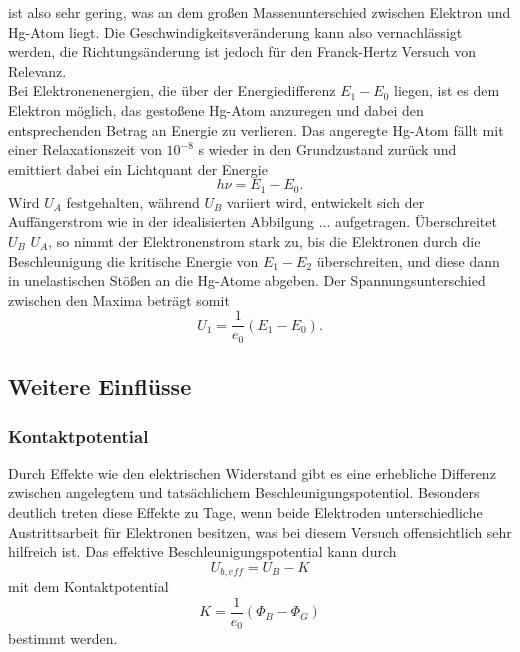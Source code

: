     ist also sehr gering, was an dem großen Massenunterschied zwischen Elektron und 
    Hg-Atom liegt. Die Geschwindigkeitsveränderung kann also vernachlässigt werden,
    die Richtungsänderung ist jedoch für den Franck-Hertz Versuch von Relevanz.\\
    Bei Elektronenenergien, die über der Energiedifferenz $E_1-E_0$ liegen, ist es 
    dem Elektron möglich, das gestoßene Hg-Atom anzuregen und dabei den entsprechenden 
    Betrag an Energie zu verlieren. Das angeregte Hg-Atom fällt mit einer Relaxationszeit
    von $10^{-8}$ s wieder in den 
    Grundzustand zurück und emittiert dabei ein Lichtquant der Energie
    \begin{equation}
        h\nu = E_1-E_0 .
    \end{equation}
    Wird $U_A$ festgehalten, während $U_B$ variiert wird, entwickelt sich der Auffängerstrom
    wie in der idealisierten Abbilgung ... aufgetragen. Überschreitet $U_B$ $U_A$, so 
    nimmt der Elektronenstrom stark zu, bis die Elektronen durch die Beschleunigung die
    kritische Energie von $E_1-E_2$ überschreiten, und diese dann in unelastischen Stößen
    an die Hg-Atome abgeben. Der Spannungsunterschied zwischen den Maxima beträgt somit
    \begin{equation}
        U_1 = \dfrac{1}{e_0}(E_1-E_0).
    \end{equation}

\subsection{Weitere Einflüsse}
    \subsubsection{Kontaktpotential}
        Durch Effekte wie den elektrischen Widerstand gibt es eine erhebliche Differenz zwischen 
        angelegtem und tatsächlichem Beschleunigungspotentiol. Besonders deutlich treten diese
        Effekte zu Tage, wenn beide Elektroden unterschiedliche Austrittsarbeit für Elektronen 
        besitzen, was bei diesem Versuch offensichtlich sehr hilfreich ist. Das effektive 
        Beschleunigungspotential kann durch 
        \begin{equation}
            U_{b, eff} = U_B - K
        \end{equation}
        mit dem Kontaktpotential
        \begin{equation}
            K = \dfrac{1}{e_0}(\Phi_B - \Phi_G)
        \end{equation}
        bestimmt werden.
